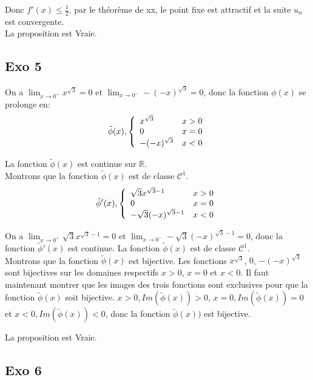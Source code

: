 \documentclass[]{book}
\theoremstyle{definition}
\newcommand{\bb}[1]{\mathbb{#1}}
\newcommand{\R}{\bb{R}}
\begin{document}
Donc $f'(x) \leq \frac{1}{2}$, par le th\'eor\`eme de xx, le point fixe est attractif et la suite $u_n$ est convergente.\\

La proposition est Vraie.

\subsection*{Exo 5}
On a $\lim_{x \to 0^+}x^{\sqrt{3}} = 0$ et $\lim_{x \to 0^-}-(-x)^{\sqrt{3}} = 0$, donc la fonction $\phi(x)$ se prolonge en:
$$\tilde{\phi}(x),
\left\{ 
\begin{array}{l l}
 x^{\sqrt{3}} & x > 0\\
 0 & x = 0\\
 -(-x)^{\sqrt{3}} & x < 0\\
\end{array}
\right. 
$$

La fonction $\tilde{\phi}(x)$ est continue sur $\R$.\\
Montrons que la fonction $\tilde{\phi}(x)$ est de classe $\mathcal{C}^1$.
$$\tilde{\phi}'(x),
\left\{ 
\begin{array}{l l}
 \sqrt{3}x^{\sqrt{3}-1} & x > 0\\
 0 & x = 0\\
 -\sqrt{3}(-x)^{\sqrt{3}-1} & x < 0\\
\end{array}
\right. 
$$

On a $\lim_{x \to 0^+} \sqrt{3}x^{\sqrt{3}-1} = 0$ et $\lim_{x \to 0^-} -\sqrt{3}(-x)^{\sqrt{3}-1} = 0$, donc la fonction $\tilde{\phi}'(x)$ est continue. La fonction $\tilde{\phi}(x)$ est de classe $\mathcal{C}^{1}$.\\

Montrons que la fonction $\tilde{\phi}(x)$ est bijective.
Les fonctions $x^{\sqrt{3}}$, $0$, $-(-x)^{\sqrt{3}}$ sont bijectives sur les domaines respectifs $x>0$, $x=0$ et $x<0$. Il faut maintenant montrer que les images des trois fonctions sont exclusives pour que la fonction $\tilde{\phi}(x)$ soit bijective.
$x>0, Im(\tilde{\phi}(x)) > 0$, $x=0, Im(\tilde{\phi}(x)) = 0$ et $x<0, Im(\tilde{\phi}(x)) < 0$, donc la fonction $\tilde{\phi}(x))$ est bijective.

La proposition est Vraie.

\subsection*{Exo 6}
\end{document}
